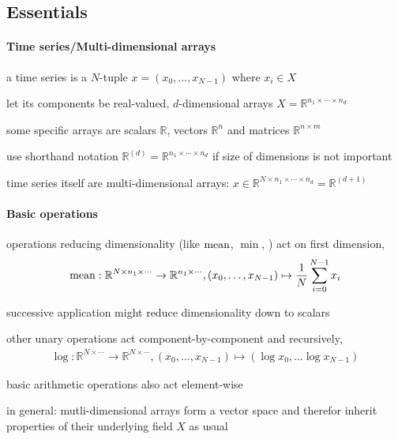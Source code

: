 \subsection{Essentials}

\paragraph{Time series/Multi-dimensional arrays}
\begin{itemize*}
	\item a time series is a $N$-tuple $x=(x_0, \ldots, x_{N-1})$ where $x_i\in X$
	\item let its components be real-valued, $d$-dimensional arrays $X=\mathbb R^{n_1\times\cdots\times n_d}$
	\item some specific arrays are scalars $\mathbb R$, vectors $\mathbb R^n$ and matrices $\mathbb R^{n\times m}$
	\item use shorthand notation $\mathbb R^{(d)}=\mathbb R^{n_1\times\cdots\times n_d}$ if size of dimensions is not important
	\item time series itself are multi-dimensional arrays: $x\in\mathbb R^{N\times n_1\times\cdots\times n_d}=\mathbb R^{(d+1)}$
\end{itemize*}

\paragraph{Basic operations}
\begin{itemize*}
	\item operations reducing dimensionality (like $\operatorname{mean}$, $\min$, \etc) act on first dimension, \eg
		\begin{eqnarray*}
			\operatorname{mean}:\mathbb R^{N\times n_1\times\cdots}\rightarrow\mathbb R^{n_1\times\cdots},(x_0,\ldots,x_{N-1})\mapsto\frac1N\sum_{i=0}^{N-1}x_i
		\end{eqnarray*}
	\item successive application might reduce dimensionality down to scalars
	\item other unary operations act component-by-component and recursively, \eg
		\begin{eqnarray*}
			\log:\mathbb R^{N\times\cdots}\rightarrow\mathbb R^{N\times\cdots},(x_0,\ldots,x_{N-1})\mapsto(\log x_0,\ldots\log x_{N-1})
		\end{eqnarray*}
	\item basic arithmetic operations also act element-wise
	\item in general: mutli-dimensional arrays form a vector space and therefor inherit properties of their underlying field $X$ as usual
\end{itemize*}

